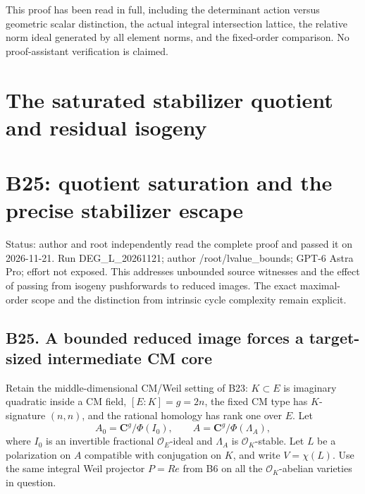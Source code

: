 \documentclass[11pt,a4paper]{article}
\providecommand{\tightlist}{\setlength{\itemsep}{0pt}\setlength{\parskip}{0pt}}
\theoremstyle{definition}
\begin{document}
This proof has been read in full, including the determinant action versus geometric scalar distinction, the actual integral intersection lattice, the relative norm ideal generated by all element norms, and the fixed-order comparison. No proof-assistant verification is claimed.

\section{The saturated stabilizer quotient and residual isogeny}

\providecommand{\tightlist}{\setlength{\itemsep}{0pt}\setlength{\parskip}{0pt}}
\section{B25: quotient saturation and the precise stabilizer escape}\label{b25-quotient-saturation-and-the-precise-stabilizer-escape}

Status: author and root independently read the complete proof and passed it on 2026-11-21. Run DEG\_L\_20261121; author /root/lvalue\_bounds; GPT-6 Astra Pro; effort not exposed. This addresses unbounded source witnesses and the effect of passing from isogeny pushforwards to reduced images. The exact maximal-order scope and the distinction from intrinsic cycle complexity remain explicit.

\subsection{B25. A bounded reduced image forces a target-sized intermediate CM core}\label{b25.-a-bounded-reduced-image-forces-a-target-sized-intermediate-cm-core}

Retain the middle-dimensional CM/Weil setting of B23: \(K\subset E\) is imaginary quadratic inside a CM field, \([E:K]=g=2n\), the fixed CM type has \(K\)-signature \((n,n)\), and the rational homology has rank one over \(E\). Let \[
 A_0=\mathbf C^g/\Phi(I_0),\qquad
 A=\mathbf C^g/\Phi(\Lambda_A),
\] where \(I_0\) is an invertible fractional \(\mathcal O_E\)-ideal and \(\Lambda_A\) is \(\mathcal O_K\)-stable. Let \(L\) be a polarization on \(A\) compatible with conjugation on \(K\), and write \(V=\chi(L)\). Use the same integral Weil projector \(P=Re\) from B6 on all the \(\mathcal O_K\)-abelian varieties in question.
\end{document}

